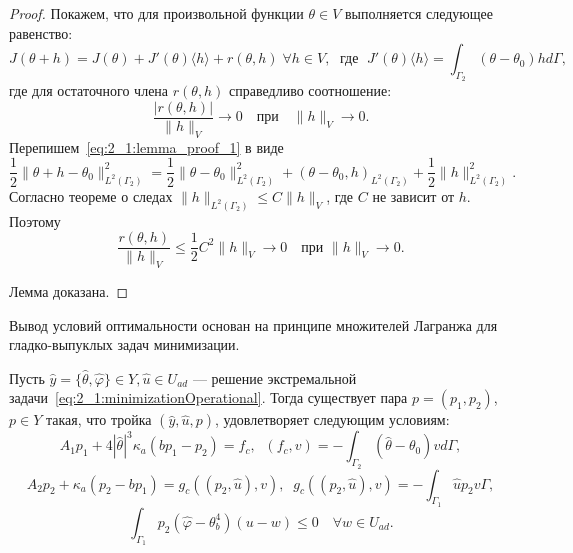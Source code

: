 \begin{proof}
    Покажем, что для произвольной функции $\theta \in V$ выполняется следующее равенство:
    \begin{equation}
        \label{eq:2_1:lemma_proof_1}
        J(\theta + h) = J(\theta) + J'(\theta)\langle h \rangle
        + r(\theta, h) \; \forall h \in V, \; \text{ где } \;
        J'(\theta)\langle h \rangle = \int_{\Gamma_2} (\theta - \theta_0)h d\Gamma,
    \end{equation}
    где для остаточного члена $r(\theta,h)$ справедливо соотношение:
    \begin{equation}
        \label{eq:2_1:lemma_proof_2}
        \frac{|r(\theta,h)|}{\|h\|_V} \rightarrow 0
        \quad \text{при} \quad \|h\|_V \rightarrow 0.
    \end{equation}
    Перепишем~\eqref{eq:2_1:lemma_proof_1} в виде
    \[
        \frac{1}{2} \|\theta + h - \theta_0\|^2_{L^2(\Gamma_2)} =
        \frac{1}{2} \| \theta - \theta_0 \|^2_{L^2(\Gamma_2)} +
        (\theta - \theta_0, h)_{L^2(\Gamma_2)} +
        \frac{1}{2}\| h \|^2_{L^2(\Gamma_2)}.
    \]
    Согласно теореме о следах $ \|h\|_{L^2(\Gamma_2)} \le C \|h\|_V $,
    где $C$ не зависит от $h$.
    Поэтому
    \[
        \frac{r(\theta,h)}{\| h \|_V} \leq
        \frac{1}{2} C^2 \| h \|_V \rightarrow 0 \quad \text{при } \| h \|_V \rightarrow 0.
    \]

    Лемма доказана.
\end{proof}

Вывод условий оптимальности основан на принципе множителей
Лагранжа для гладко-выпуклых задач минимизации.
\begin{theorem}
    \label{th:2_1:2}
    Пусть $\hat{y}=\{\hat{\theta},\hat{\varphi} \} \in Y, \hat{u} \in U_{ad}$
    --- решение экстремальной задачи~\eqref{eq:2_1:minimizationOperational}.
    Тогда существует пара $p = (p_1, p_2)$, $p \in Y$
    такая, что тройка $(\hat{y}, \hat{u}, p)$, удовлетворяет следующим условиям:
    \begin{equation}
        \label{eq:2_1:therorem_2_eq1}
        A_1 p_1 + 4 |\hat{\theta}|^3 \kappa_a(b p_1 - p_2) = f_c,
        \;\; (f_c,v) = - \int_{\Gamma_2} (\hat{\theta} - \theta_0) v d\Gamma,
    \end{equation}
    \begin{equation}
        \label{eq:2_1:therorem_2_eq2}
        A_2 p_2 + \kappa_a (p_2-b p_1) = g_c(( p_2, \hat{u}),v),
        \;\; g_c(( p_2, \hat{u}),v) = -\int_{\Gamma_1} \hat{u} p_2 v\Gamma,
    \end{equation}
    \begin{equation}
        \label{eq:2_1:therorem_2_eq3}
        \int_{\Gamma_1} p_2 (\hat{\varphi} - \theta_b^4)(u-w) \leq 0 \quad \forall w \in U_{ad}.
    \end{equation}
\end{theorem}

